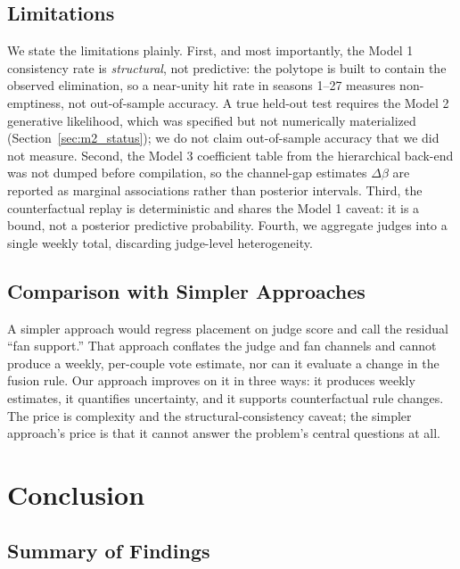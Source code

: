 \documentclass{article}
\begin{document}
\subsection{Limitations}

We state the limitations plainly. First, and most importantly, the Model 1 consistency rate
is \emph{structural}, not predictive: the polytope is built to contain the observed
elimination, so a near-unity hit rate in seasons 1--27 measures non-emptiness, not
out-of-sample accuracy. A true held-out test requires the Model 2 generative likelihood,
which was specified but not numerically materialized (Section~\ref{sec:m2_status}); we do
not claim out-of-sample accuracy that we did not measure. Second, the Model 3 coefficient
table from the hierarchical back-end was not dumped before compilation, so the channel-gap
estimates $\Delta\beta$ are reported as marginal associations rather than posterior
intervals. Third, the counterfactual replay is deterministic and shares the Model 1 caveat:
it is a bound, not a posterior predictive probability. Fourth, we aggregate judges into a
single weekly total, discarding judge-level heterogeneity.

\subsection{Comparison with Simpler Approaches}

A simpler approach would regress placement on judge score and call the residual ``fan
support.'' That approach conflates the judge and fan channels and cannot produce a weekly,
per-couple vote estimate, nor can it evaluate a change in the fusion rule. Our approach
improves on it in three ways: it produces weekly estimates, it quantifies uncertainty, and
it supports counterfactual rule changes. The price is complexity and the structural-consistency
caveat; the simpler approach's price is that it cannot answer the problem's central
questions at all.

\section{Conclusion}\label{sec:conclusion}

\subsection{Summary of Findings}
\end{document}
